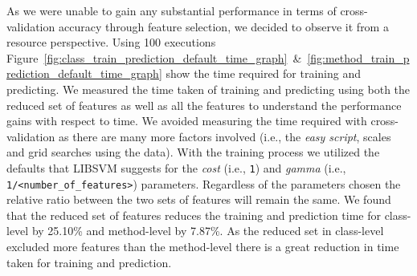 As we were unable to gain any substantial performance in terms of cross-validation accuracy through feature selection, we decided to observe it from a resource perspective. Using 100 executions Figure~\ref{fig:class_train_prediction_default_time_graph}~\&~\ref{fig:method_train_prediction_default_time_graph} show the time required for training and predicting. We measured the time taken of training and predicting using both the reduced set of features as well as all the features to understand the performance gains with respect to time. We avoided measuring the time required with cross-validation as there are many more factors involved (i.e., the \emph{easy script}, scales and grid searches using the data). With the training process we utilized the defaults that LIBSVM suggests for the \emph{cost} (i.e., \texttt{1}) and \emph{gamma} (i.e., \texttt{1/<number\_of\_features>}) parameters. Regardless of the parameters chosen the relative ratio between the two sets of features will remain the same. We found that the reduced set of features reduces the training and prediction time for class-level by 25.10\% and method-level by 7.87\%. As the reduced set in class-level excluded more features than the method-level there is a great reduction in time taken for training and prediction.
